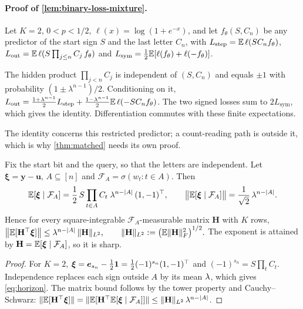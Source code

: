 \paragraph{Proof of \cref{lem:binary-loss-mixture}.} Let $K=2$, $0<p<1/2$, $\ell(x)=\log(1+e^{-x})$, and let $f_\theta(S,C_n)$ be
any predictor of the start sign $S$ and the last letter $C_n$, with
$L_{\mathrm{step}}=\mathbb E\,\ell(SC_nf_\theta)$, $L_{\mathrm{out}}=\mathbb E\,\ell(S\prod_{j\le n}C_j\,f_\theta)$ and
$L_{\mathrm{sym}}=\frac12\mathbb E[\ell(f_\theta)+\ell(-f_\theta)]$.

The hidden product $\prod_{j<n}C_j$ is independent of $(S,C_n)$ and equals $\pm1$ with probability
$(1\pm\lambda^{n-1})/2$. Conditioning on it,
$L_{\mathrm{out}}=\frac{1+\lambda^{n-1}}2L_{\mathrm{step}}+\frac{1-\lambda^{n-1}}2\mathbb E\,\ell(-SC_nf_\theta)$.
The two signed losses sum to $2L_{\mathrm{sym}}$, which gives the identity. Differentiation commutes with these finite expectations.

The identity concerns this restricted predictor; a count-reading path is outside it, which is why
\cref{thm:matched} needs its own proof.

\begin{lemma}
\label{lem:target-contraction}
Fix the start bit and the query, so that the letters are independent. Let $\bm\xi=\bm y-\bm u$, $A\subseteq[n]$ and
$\mathcal F_A=\sigma(w_t:t\in A)$. Then
\begin{equation}
 \E[\bm\xi\mid\mathcal F_A]=\tfrac12\,S\prod_{t\in A}C_t\;\mixrate^{n-|A|}\,(1,-1)^\top,
 \qquad \bigl\|\E[\bm\xi\mid\mathcal F_A]\bigr\|=\tfrac1{\sqrt2}\,\mixrate^{n-|A|}.
 \label{eq:horizon}
\end{equation}
Hence for every square-integrable $\mathcal F_A$-measurable matrix $\mathbf H$ with $K$ rows,
 $\bigl\|\mathbb E[\mathbf H^\top\bm\xi]\bigr\|\le\lambda^{n-|A|}\,\|\mathbf H\|_{L^2},\qquad \|\mathbf H\|_{L^2}:=\bigl(\mathbb E\|\mathbf H\|_F^2\bigr)^{1/2}.$
The exponent is attained by $\mathbf H=\mathbb E[\bm\xi\mid\mathcal F_A]$, so it is sharp.
\end{lemma}

\begin{proof}
For $K=2$, $\bm\xi=\bm e_{s_n}-\frac12\mathbf 1=\frac12(-1)^{s_n}(1,-1)^\top$ and $(-1)^{s_n}=S\prod_tC_t$. Independence replaces each sign outside $A$
by its mean $\lambda$, which gives \cref{eq:horizon}. The matrix bound follows by the tower property and Cauchy--Schwarz:
$\|\mathbb E[\mathbf H^\top\bm\xi]\|=\|\mathbb E[\mathbf H^\top\mathbb E[\bm\xi\mid\mathcal F_A]]\|\le\|\mathbf H\|_{L^2}\,\lambda^{n-|A|}$.
\end{proof}

